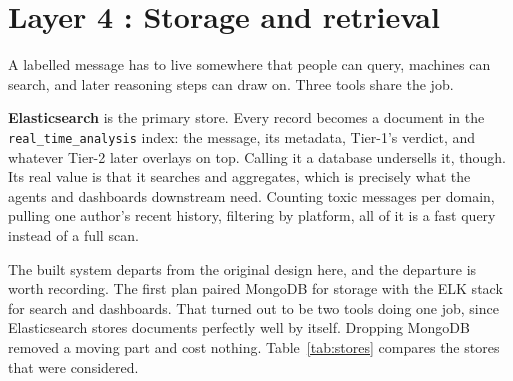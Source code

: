 \section{Layer 4 : Storage and retrieval}\label{layer-4-storage-and-retrieval}

A labelled message has to live somewhere that people can query, machines can search, and later reasoning steps can draw on. Three tools share the job.

\textbf{Elasticsearch} is the primary store. Every record becomes a document in the \texttt{real\_time\_analysis} index: the message, its metadata, Tier-1's verdict, and whatever Tier-2 later overlays on top. Calling it a database undersells it, though. Its real value is that it searches and aggregates, which is precisely what the agents and dashboards downstream need. Counting toxic messages per domain, pulling one author's recent history, filtering by platform, all of it is a fast query instead of a full scan.

The built system departs from the original design here, and the departure is worth recording. The first plan paired MongoDB for storage with the ELK stack for search and dashboards. That turned out to be two tools doing one job, since Elasticsearch stores documents perfectly well by itself. Dropping MongoDB removed a moving part and cost nothing. Table~\ref{tab:stores} compares the stores that were considered.
\renewcommand{\arraystretch}{1.5} 

